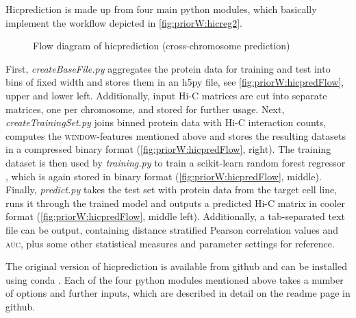 Hicprediction is made up from four main python modules, which basically implement the workflow depicted in 
\autoref{fig:priorW:hicreg2}. 
\begin{figure}[htb]
 \small
 \centering
 \caption{Flow diagram of hicprediction (cross-chromosome prediction)}
 \label{fig:priorW:hicpredFlow}
\end{figure}
First, \emph{createBaseFile.py} \cite{hicpred2020bf} aggregates the protein data for training and test into bins of fixed width and stores them in an h5py 
file, 
see 
\autoref{fig:priorW:hicpredFlow}, upper and lower left.
Additionally, input Hi-C matrices are cut into separate matrices, one per chromosome, and stored for further usage.
Next, \emph{createTrainingSet.py} \cite{hicpred2020cts} joins binned protein data with Hi-C interaction counts, computes the \textsc{window}-features mentioned 
above and 
stores the resulting datasets in a compressed binary format (\autoref{fig:priorW:hicpredFlow}, right).
The training dataset is then used by \emph{training.py} \cite{hicpred2020tr} to train a scikit-learn random forest regressor \cite{Pedregosa2011}, 
which is again stored in binary format (\autoref{fig:priorW:hicpredFlow}, middle).
Finally, \emph{predict.py} \cite{hicpred2020pr} takes the test set with protein data from the target cell line, 
runs it through the trained model and outputs a predicted Hi-C matrix in cooler format (\autoref{fig:priorW:hicpredFlow}, middle left).
Additionally, a tab-separated text file can be output, containing distance stratified Pearson correlation values and \textsc{auc},
plus some other statistical measures and parameter settings for reference. 

The original version of hicprediction is available from github \cite{BajoratHicpredWWW2019} and can be 
installed using conda \cite{minicondaWWW2019}.
Each of the four python modules mentioned above takes a number of options and further inputs, 
which are described in detail on the readme page in github.